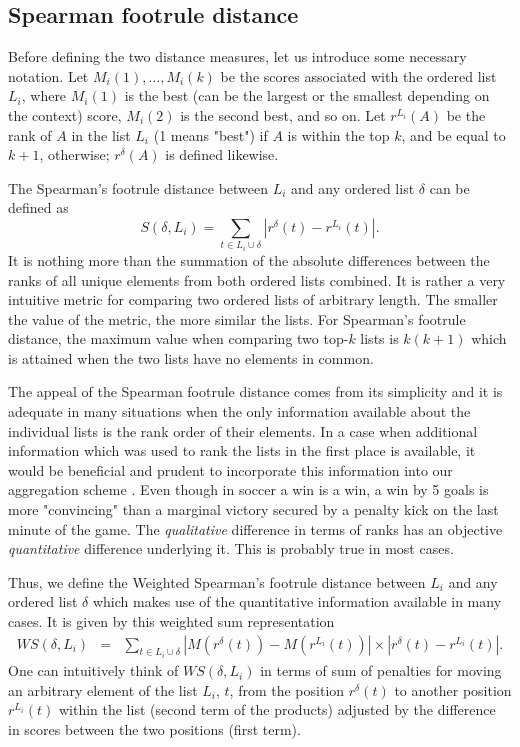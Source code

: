 \documentclass[11pt]{article}
\begin{document}
\subsection{Spearman footrule distance}
Before defining the two distance measures, let us introduce some necessary notation. Let $M_i(1), \ldots, M_i(k)$
    be the scores associated with the ordered list $L_i$, where $M_i(1)$ is the best (can be the largest or the smallest depending on the context)
    score, $M_i(2)$ is the second best, and so on. Let $r^{L_i}(A)$ be the rank of $A$ in the list $L_i$ (1 means "best") 
    if $A$ is within the top $k$, and be equal to $k+1$, otherwise; $r^\delta(A)$ is defined likewise.

    The Spearman's footrule distance between $L_i$ and any ordered list $\delta$ can be defined as
    $$
    S(\delta, L_i)=\sum_{t \in L_i \cup \delta} |r^\delta(t)-r^{L_i}(t)|.
    $$
    It is nothing more than the summation of the absolute differences between the ranks of all unique
    elements from both ordered lists combined. It is rather a very intuitive metric for comparing two ordered
    lists of arbitrary length. The smaller the value of the metric, the more similar the lists. For Spearman's
    footrule distance, the maximum value when comparing two top-$k$ lists is $k(k+1)$ which is attained when the two
    lists have no elements in common.
    
The appeal of the Spearman footrule distance comes from its simplicity and it is adequate in many situations when the only
information available about the individual lists is the rank order of their elements. In a case when additional information which was
used to rank the lists in the first place is available, it would be beneficial and prudent to incorporate this information into
our aggregation scheme \cite{Pih07}. Even though in soccer a win is a win, a win by 5 goals is more "convincing" than a marginal victory secured by a penalty kick on the last minute 
of the game. The \emph{qualitative} difference in terms of ranks has an objective \emph{quantitative} difference underlying it. This is probably true in most cases.

Thus, we define the Weighted Spearman's footrule distance between $L_i$ and any ordered list $\delta$ which makes use of the quantitative information 
available in many cases. It is given by this weighted sum representation
    \begin{eqnarray*}
    WS(\delta, L_i)&=& \sum_{t \in L_i \cup \delta}
    |M(r^\delta(t))-M(r^{L_i}(t))| \times |r^\delta(t)-r^{L_i}(t)|.
    \end{eqnarray*}
One can intuitively think of $WS(\delta, L_i)$ in terms of sum of penalties for moving an arbitrary element of the list $L_i$, $t$, from the
    position $r^\delta(t)$ to another position $r^{L_i}(t)$ within the list (second term of the products) adjusted by the
    difference in scores between the two positions (first term). 
    
\end{document}

